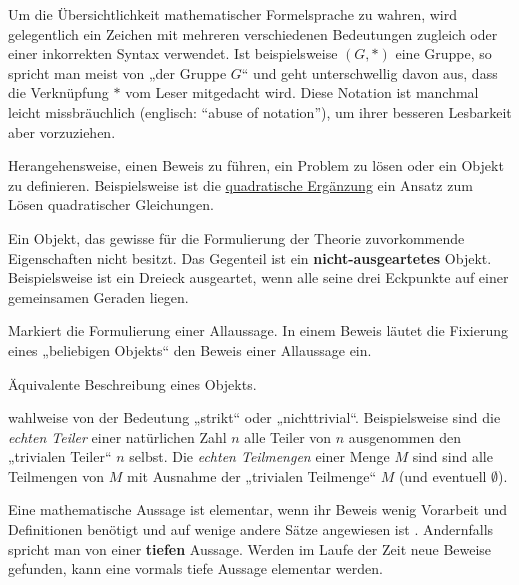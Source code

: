 \begin{description}[labelindent=0pt, leftmargin=0pt]

    \item[abuse of notation:] Um die Übersichtlichkeit mathematischer Formelsprache zu wahren, wird gelegentlich ein Zeichen mit mehreren verschiedenen Bedeutungen zugleich oder einer inkorrekten Syntax verwendet. Ist beispielsweise $(G,*)$ eine Gruppe, so spricht man meist von „der Gruppe $G$“ und geht unterschwellig davon aus, dass die Verknüpfung $*$ vom Leser mitgedacht wird. Diese Notation ist manchmal leicht missbräuchlich (englisch: ``abuse of notation''), um ihrer besseren Lesbarkeit aber vorzuziehen.

    \item[Ansatz:] Herangehensweise, einen Beweis zu führen, ein Problem zu lösen oder ein Objekt zu definieren. Beispielsweise ist die \href{https://en.wikipedia.org/wiki/Completing_the_square}{quadratische Ergänzung} ein Ansatz zum Lösen quadratischer Gleichungen. 
    
    \item[Ausgeartet:] Ein Objekt, das gewisse für die Formulierung der Theorie zuvorkommende Eigenschaften nicht besitzt. Das Gegenteil ist ein \textbf{nicht-ausgeartetes} Objekt. Beispielsweise ist ein Dreieck ausgeartet, wenn alle seine drei Eckpunkte auf einer gemeinsamen Geraden liegen.

    \item[Beliebig:] Markiert die Formulierung einer Allaussage. In einem Beweis läutet die Fixierung eines „beliebigen Objekts“ den Beweis einer Allaussage ein.

    \item[Charakterisierung:] Äquivalente Beschreibung eines Objekts.

    \item[Echt:] wahlweise von der Bedeutung „strikt“ oder „nichttrivial“. Beispielsweise sind die \emph{echten Teiler} einer natürlichen Zahl $n$ alle Teiler von $n$ ausgenommen den „trivialen Teiler“ $n$ selbst. Die \emph{echten Teilmengen} einer Menge $M$ sind sind alle Teilmengen von $M$ mit Ausnahme der „trivialen Teilmenge“ $M$ (und eventuell $\emptyset$).
    
    \item[Elementar:] Eine mathematische Aussage ist elementar, wenn ihr Beweis wenig Vorarbeit und Definitionen benötigt und auf wenige andere Sätze angewiesen ist . Andernfalls spricht man von einer \textbf{tiefen} Aussage. Werden im Laufe der Zeit neue Beweise gefunden, kann eine vormals tiefe Aussage elementar werden.


\end{description}
